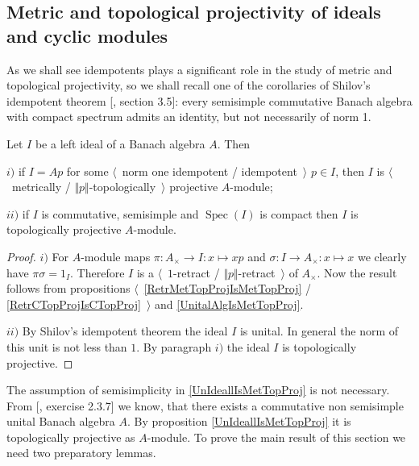 
\subsection{Metric and topological projectivity of ideals and cyclic modules}
\label{SubSectionMetricAndTopologicalProjectivityOfIdealsAndCyclicModules}

As we shall see idempotents plays a significant role in the study of metric and topological projectivity, so we shall recall one of the corollaries of Shilov's idempotent theorem [\cite{KaniBanAlg}, section 3.5]: every semisimple commutative Banach algebra with compact spectrum admits an identity, but not necessarily of norm 1. 

\begin{proposition}\label{UnIdeallIsMetTopProj}
Let $I$ be a left ideal of a Banach algebra $A$. Then

$i)$ if $I=Ap$ for some $\langle$~norm one idempotent / idempotent~$\rangle$ $p\in I$, then $I$ is $\langle$~metrically / $\Vert p\Vert$-topologically~$\rangle$ projective $A$-module;

$ii)$ if $I$ is commutative, semisimple and $\operatorname{Spec}(I)$ is compact then $I$ is topologically projective $A$-module.
\end{proposition}
\begin{proof} 
$i)$ For $A$-module maps $\pi:A_\times\to I:x\mapsto xp$ and $\sigma:I\to A_\times:x\mapsto x$ we clearly have $\pi\sigma=1_I$. Therefore $I$ is a $\langle$~$1$-retract / $\Vert p\Vert$-retract~$\rangle$ of $A_\times$. Now the result follows from propositions $\langle$~\ref{RetrMetTopProjIsMetTopProj} / \ref{RetrCTopProjIsCTopProj}~$\rangle$ and \ref{UnitalAlgIsMetTopProj}.

$ii)$ By Shilov's idempotent theorem the ideal $I$ is unital. In general the norm of this unit is not less than $1$. By paragraph $i)$ the ideal $I$ is topologically projective.
\end{proof}

The assumption of semisimplicity in \ref{UnIdeallIsMetTopProj} is not necessary.
From [\cite{DalesIntroBanAlgOpHarmAnal}, exercise 2.3.7] we know, that there exists a commutative non semisimple unital Banach algebra $A$. By proposition \ref{UnIdeallIsMetTopProj} it is topologically projective as $A$-module. 
To prove the main result of this section we need two preparatory lemmas.


